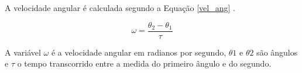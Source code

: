 A velocidade angular é calculada segundo a Equação \ref{vel_ang} .


\begin{equation}
	\label{vel_ang}
	\omega =  \frac{\theta_2 - \theta_1}{\tau}
\end{equation}

A variável $\omega$ é a velocidade angular em radianos por segundo, $\theta1$ e $\theta2$ são ângulos e $\tau$ o tempo transcorrido entre a medida do primeiro ângulo e do segundo.


